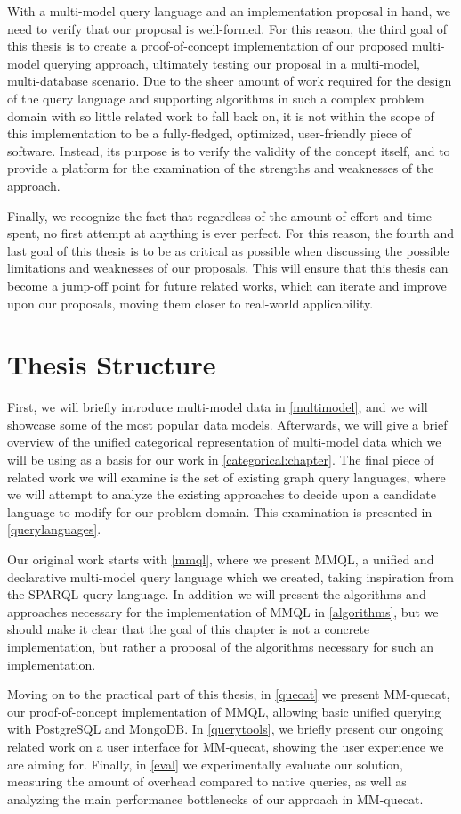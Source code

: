 With a multi-model query language and an implementation proposal in hand, we need to verify that our proposal is well-formed.
For this reason, the third goal of this thesis is to create a proof-of-concept implementation of our proposed multi-model querying approach, ultimately testing our proposal in a multi-model, multi-database scenario.
Due to the sheer amount of work required for the design of the query language and supporting algorithms in such a complex problem domain with so little related work to fall back on, it is not within the scope of this implementation to be a fully-fledged, optimized, user-friendly piece of software.
Instead, its purpose is to verify the validity of the concept itself, and to provide a platform for the examination of the strengths and weaknesses of the approach.

Finally, we recognize the fact that regardless of the amount of effort and time spent, no first attempt at anything is ever perfect.
For this reason, the fourth and last goal of this thesis is to be as critical as possible when discussing the possible limitations and weaknesses of our proposals.
This will ensure that this thesis can become a jump-off point for future related works, which can iterate and improve upon our proposals, moving them closer to real-world applicability.

\section*{Thesis Structure}

First, we will briefly introduce multi-model data in \cref{multimodel}, and we will showcase some of the most popular data models.
Afterwards, we will give a brief overview of the unified categorical representation of multi-model data which we will be using as a basis for our work in \cref{categorical:chapter}.
The final piece of related work we will examine is the set of existing graph query languages, where we will attempt to analyze the existing approaches to decide upon a candidate language to modify for our problem domain.
This examination is presented in \cref{querylanguages}.

Our original work starts with \cref{mmql}, where we present MMQL, a unified and declarative multi-model query language which we created, taking inspiration from the SPARQL query language.
In addition we will present the algorithms and approaches necessary for the implementation of MMQL in \cref{algorithms}, but we should make it clear that the goal of this chapter is not a concrete implementation, but rather a proposal of the algorithms necessary for such an implementation.

Moving on to the practical part of this thesis, in \cref{quecat} we present MM-quecat, our proof-of-concept implementation of MMQL, allowing basic unified querying with PostgreSQL and MongoDB.
In \cref{querytools}, we briefly present our ongoing related work on a user interface for MM-quecat, showing the user experience we are aiming for.
Finally, in \cref{eval} we experimentally evaluate our solution, measuring the amount of overhead compared to native queries, as well as analyzing the main performance bottlenecks of our approach in MM-quecat.
